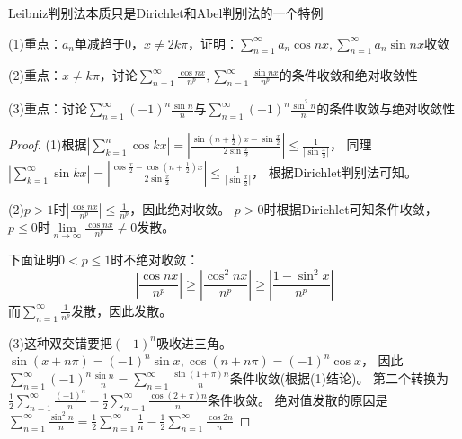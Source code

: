 \begin{note}
  Leibniz判别法本质只是Dirichlet和Abel判别法的一个特例
\end{note}

\begin{exercise}[常用三角结论]
  (1)重点：$a_n$单减趋于$0$，$x \neq 2k\pi$，证明：$\sum\limits_{n = 1}^{\infty}a_n \cos nx, \sum\limits_{n = 1}^{\infty}a_n \sin nx$收敛

  (2)重点：$x \neq k\pi$，讨论$\sum\limits_{n = 1}^{\infty}\frac{\cos nx}{n^p}, \sum\limits_{n = 1}^{\infty}\frac{\sin nx}{n^p}$的条件收敛和绝对收敛性

  (3)重点：讨论$\sum\limits_{n = 1}^{\infty}(-1)^n \frac{\sin n}{n}$与$\sum\limits_{n= 1}^{\infty}(-1)^n \frac{\sin^2 n}{n}$的条件收敛与绝对收敛性
\end{exercise}

\begin{proof}
  (1)根据$|\sum\limits_{k = 1}^n \cos kx| = |\frac{\sin(n + \frac{1}{2})x - \sin \frac{x}{2}}{2 \sin \frac{x}{2}}| \leq \frac{1}{|\sin \frac{x}{2}|}$，
  同理$|\sum\limits_{k = 1}^{\infty}\sin kx| = |\frac{\cos \frac{x}{2} - \cos(n + \frac{1}{2})x}{2\sin \frac{x}{2}}| \leq \frac{1}{|\sin \frac{x}{2}|}$，
  根据Dirichlet判别法可知。

  (2)$p > 1$时$|\frac{\cos nx}{n^p}| \leq \frac{1}{n^p}$，因此绝对收敛。
  $p > 0$时根据Dirichlet可知条件收敛，
  $p \leq 0$时$\lim \limits _{n \rightarrow \infty} \frac{\cos nx}{n^p} \neq 0$发散。

  下面证明$0 < p \leq 1$时不绝对收敛：
  \begin{equation*}
    \left| \frac{\cos nx}{n^p} \right| \geq
    \left| \frac{\cos ^2 nx}{n^p} \right| \geq
    \left| \frac{1 - \sin^2 x}{n^p} \right|
  \end{equation*}
  而$\sum\limits_{n = 1}^{\infty} \frac{1}{n^p}$发散，因此发散。

  (3)这种双交错要把$(-1)^n$吸收进三角。
  $\sin(x + n\pi) = (-1)^n \sin x, \cos(n + n\pi) = (-1)^n \cos x$，
  因此$\sum\limits_{n = 1}^{\infty}(-1)^n \frac{\sin n}{n} = \sum\limits_{n = 1}^{\infty}\frac{\sin(1 + \pi)n}{n}$条件收敛(根据(1)结论)。
  第二个转换为$\frac{1}{2} \sum\limits_{n = 1}^{\infty}\frac{(-1)^n}{n} - \frac{1}{2}\sum\limits_{n = 1}^{\infty}\frac{\cos(2+\pi)n}{n}$条件收敛。
  绝对值发散的原因是$\sum\limits_{n = 1}^{\infty}\frac{\sin^2 n}{n} = \frac{1}{2}\sum\limits_{n = 1}^{\infty}\frac{1}{n} - \frac{1}{2} \sum\limits_{n = 1}^{\infty}\frac{\cos 2n}{n}$
\end{proof}

